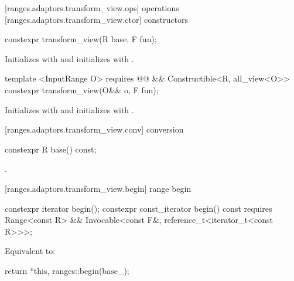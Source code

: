 [ranges.adaptors.transform_view.ops]{ operations}
[ranges.adaptors.transform_view.ctor]{ constructors}

%
\begin{itemdecl}
constexpr transform_view(R base, F fun);
\end{itemdecl}

\begin{itemdescr}
\pnum
\effects Initializes  with  and initializes
 with .
\end{itemdescr}

%
\begin{itemdecl}
template <InputRange O>
requires @@ &&
    Constructible<R, all_view<O>>
constexpr transform_view(O&& o, F fun);
\end{itemdecl}

\begin{itemdescr}
\pnum
\effects Initializes  with 
and initializes  with .
\end{itemdescr}

[ranges.adaptors.transform_view.conv]{ conversion}

%
\begin{itemdecl}
constexpr R base() const;
\end{itemdecl}

\begin{itemdescr}
\pnum
\returns {}.
\end{itemdescr}

[ranges.adaptors.transform_view.begin]{ range begin}

%
\begin{itemdecl}
constexpr iterator begin();
constexpr const_iterator begin() const
requires Range<const R> && Invocable<const F&, reference_t<iterator_t<const R>>>;
\end{itemdecl}

\begin{itemdescr}
\pnum
\effects Equivalent to:
\begin{codeblock}
return {*this, ranges::begin(base_)};
\end{codeblock}
\end{itemdescr}

